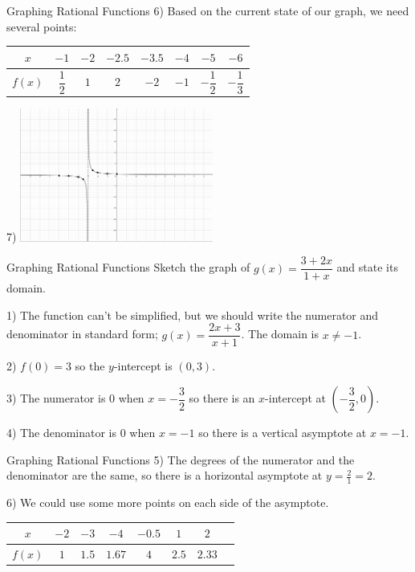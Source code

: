 \documentclass[t, aspectratio=169]{beamer}
\newcommand{\fp}[1]{\left({#1}\right)} %
\begin{document}
	\begin{frame}{Graphing Rational Functions}
		6) Based on the current state of our graph, we need several points: \pause
		
		\begin{tabular}{c|ccccccc}
			$x$ & $-1$ & $-2$ & $-2.5$ & $-3.5$ & $-4$ & $-5$ & $-6$ \\ \hline
			$f(x)$ & $\dfrac12$ & $1$ & $2$ & $-2$ & $-1$ & $-\dfrac12$ & $-\dfrac13$
		\end{tabular} \pause
	
		7) \includegraphics[width=2.5in]{Rat1.png}
	\end{frame}

	\begin{frame}{Graphing Rational Functions}
		Sketch the graph of $g(x) = \dfrac{3 + 2x}{1 + x}$ and state its domain. \pause
		
		1) The function can't be simplified, but we should write the numerator and denominator in standard form; $g(x) = \dfrac{2x + 3}{x+1}$. The domain is $x \neq -1$. \pause
		
		2) $f(0) = 3$ so the $y$-intercept is $(0,3)$. \pause
		
		3) The numerator is $0$ when $x = -\dfrac32$ so there is an $x$-intercept at $\fp{-\dfrac32, 0}$. \pause
		
		4) The denominator is $0$ when $x = -1$ so there is a vertical asymptote at $x = -1$.
	\end{frame}

	\begin{frame}{Graphing Rational Functions}
		5) The degrees of the numerator and the denominator are the same, so there is a horizontal asymptote at $y = \frac{2}{1} = 2$. \pause
		
		6) We could use some more points on each side of the asymptote. \pause
		
		\begin{tabular}{c|ccccccc}
			$x$ & $-2$ & $-3$ & $-4$ & $-0.5$ & $1$ & $2$ \\ \hline
			$f(x)$ & $1$ & $1.5$ & $1.67$ & $4$ & $2.5$ & $2.33$
		\end{tabular}
	\end{frame}
\end{document}
